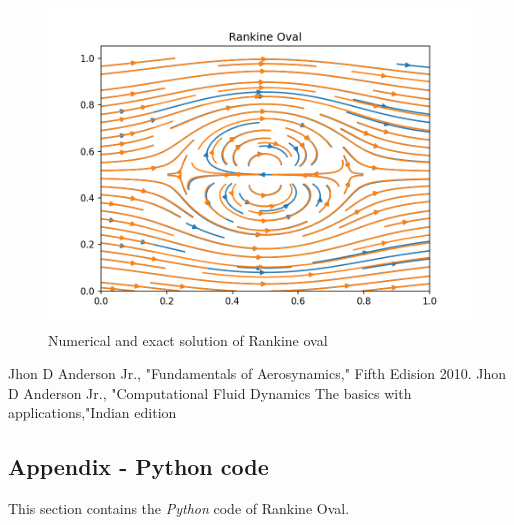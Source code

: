 \documentclass[conf]{new-aiaa}
\begin{document}
\begin{figure}[!h]
	\center
	\includegraphics[scale=0.8]{images/Result.png}
	\caption{Numerical and exact solution of Rankine oval}
	\label{fig02}
\end{figure}
\pagebreak

\begin{thebibliography}{9}
     Jhon D Anderson Jr., "Fundamentals of Aerosynamics," Fifth Edision 2010.
     Jhon D Anderson Jr., "Computational Fluid Dynamics The basics with applications,"Indian edition
\end{thebibliography}

\pagebreak
 \begin{appendices}
      \section{Appendix - Python code}\label{appendixA}
      This section contains the \emph{Python} code of Rankine Oval.
     
      
     
      \pagebreak
 \end{appendices}
\end{document}
